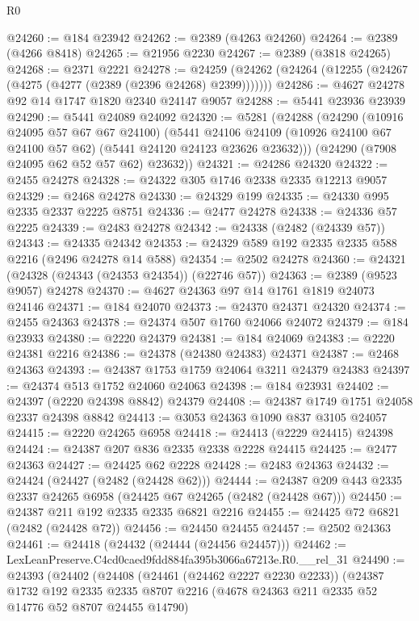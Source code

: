 \begin{lexlean}{R0}
\begin{coremodule}
@24260 := @184 @23942
@24262 := @2389 (@4263 @24260)
@24264 := @2389 (@4266 @8418)
@24265 := @21956 @2230
@24267 := @2389 (@3818 @24265)
@24268 := @2371 @2221
@24278 := @24259 (@24262 (@24264 (@12255 (@24267 (@4275 (@4277 (@2389 (@2396 @24268) @2399)))))))
@24286 := @4627 @24278 @92 @14 @1747 @1820 @2340 @24147 @9057
@24288 := @5441 @23936 @23939
@24290 := @5441 @24089 @24092
@24320 := @5281
    (@24288
      (@24290
        (@10916 @24095 @57 @67 @67 @24100)
        (@5441
          @24106
          @24109
          (@10926 @24100 @67 @24100 @57 @62)
          (@5441 @24120 @24123 @23626 @23632)))
      (@24290 (@7908 @24095 @62 @52 @57 @62) @23632))
@24321 := @24286 @24320
@24322 := @2455 @24278
@24328 := @24322 @305 @1746 @2338 @2335 @12213 @9057
@24329 := @2468 @24278
@24330 := @24329 @199
@24335 := @24330 @995 @2335 @2337 @2225 @8751
@24336 := @2477 @24278
@24338 := @24336 @57 @2225
@24339 := @2483 @24278
@24342 := @24338 (@2482 (@24339 @57))
@24343 := @24335 @24342
@24353 := @24329 @589 @192 @2335 @2335 @588 @2216 (@2496 @24278 @14 @588)
@24354 := @2502 @24278
@24360 := @24321 (@24328 (@24343 (@24353 @24354)) (@22746 @57))
@24363 := @2389 (@9523 @9057) @24278
@24370 := @4627 @24363 @97 @14 @1761 @1819 @24073 @24146
@24371 := @184 @24070
@24373 := @24370 @24371 @24320
@24374 := @2455 @24363
@24378 := @24374 @507 @1760 @24066 @24072
@24379 := @184 @23933
@24380 := @2220 @24379
@24381 := @184 @24069
@24383 := @2220 @24381 @2216
@24386 := @24378 (@24380 @24383) @24371
@24387 := @2468 @24363
@24393 := @24387 @1753 @1759 @24064 @3211 @24379 @24383
@24397 := @24374 @513 @1752 @24060 @24063
@24398 := @184 @23931
@24402 := @24397 (@2220 @24398 @8842) @24379
@24408 := @24387 @1749 @1751 @24058 @2337 @24398 @8842
@24413 := @3053 @24363 @1090 @837 @3105 @24057
@24415 := @2220 @24265 @6958
@24418 := @24413 (@2229 @24415) @24398
@24424 := @24387 @207 @836 @2335 @2338 @2228 @24415
@24425 := @2477 @24363
@24427 := @24425 @62 @2228
@24428 := @2483 @24363
@24432 := @24424 (@24427 (@2482 (@24428 @62)))
@24444 := @24387 @209 @443 @2335 @2337 @24265 @6958 (@24425 @67 @24265 (@2482 (@24428 @67)))
@24450 := @24387 @211 @192 @2335 @2335 @6821 @2216
@24455 := @24425 @72 @6821 (@2482 (@24428 @72))
@24456 := @24450 @24455
@24457 := @2502 @24363
@24461 := @24418 (@24432 (@24444 (@24456 @24457)))
@24462 := LexLeanPreserve.C4cd0caed9fdd884fa395b3066a67213e.R0.__rel_31
@24490 := @24393
    (@24402
      (@24408
        (@24461 (@24462 @2227 @2230 @2233))
        (@24387
          @1732
          @192
          @2335
          @2335
          @8707
          @2216
          (@4678 @24363 @211 @2335 @52 @14776 @52 @8707 @24455 @14790)

\end{coremodule}
\end{lexlean}
